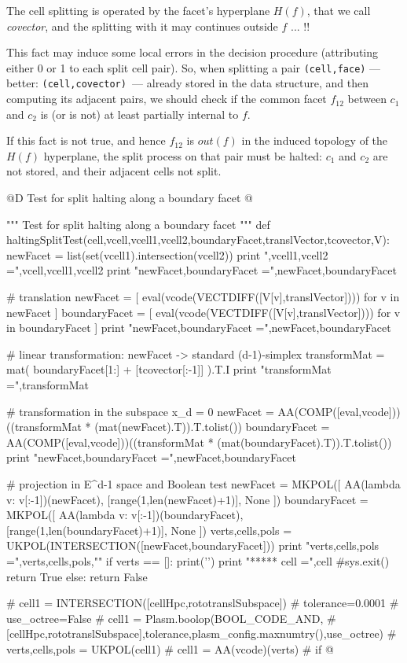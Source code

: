 \documentclass[11pt,oneside]{article}	%
\begin{document}
The cell splitting is operated by the facet's hyperplane $H(f)$, that we call \emph{covector},  and the splitting with it may continues outside $f$ ... !!

This fact may induce some local errors in the decision procedure (attributing either 0 or 1 to each split cell pair).
So, when splitting a pair \texttt{(cell,face)} --- better: \texttt{(cell,covector) }--- already stored in the data structure, and then computing its adjacent  pairs,
we should check if the common facet $f_{12}$ between $c_1$ and $c_2$ is (or is not) at least partially internal  to $f$.  

If this fact is not true, and hence $f_{12}$ is $out(f)$  in the induced topology of the $H(f)$ hyperplane, the split process on that pair must be halted:  $c_1$ and $c_2$ are not stored, and their adjacent cells not split.


@D Test for split halting along a boundary facet
@{""" Test for split halting along a boundary facet """
def haltingSplitTest(cell,vcell,vcell1,vcell2,boundaryFacet,translVector,tcovector,V):
	newFacet = list(set(vcell1).intersection(vcell2))
	print "\nvcell,vcell1,vcell2 =",vcell,vcell1,vcell2
	print "newFacet,boundaryFacet =",newFacet,boundaryFacet
	
	# translation 
	newFacet = [ eval(vcode(VECTDIFF([V[v],translVector]))) for v in newFacet ]
	boundaryFacet = [ eval(vcode(VECTDIFF([V[v],translVector]))) for v in boundaryFacet ]
	print "newFacet,boundaryFacet =",newFacet,boundaryFacet
	
	# linear transformation: newFacet -> standard (d-1)-simplex
	transformMat = mat( boundaryFacet[1:] + [tcovector[:-1]] ).T.I
	print "transformMat =",transformMat
	
	# transformation in the subspace x_d = 0
	newFacet = AA(COMP([eval,vcode]))((transformMat * (mat(newFacet).T)).T.tolist())
	boundaryFacet = AA(COMP([eval,vcode]))((transformMat * (mat(boundaryFacet).T)).T.tolist())
	print "newFacet,boundaryFacet =",newFacet,boundaryFacet
	
	# projection in E^{d-1} space and Boolean test
	newFacet = MKPOL([ AA(lambda v: v[:-1])(newFacet), [range(1,len(newFacet)+1)], None ])
	boundaryFacet = MKPOL([ AA(lambda v: v[:-1])(boundaryFacet), [range(1,len(boundaryFacet)+1)], None ])
	verts,cells,pols = UKPOL(INTERSECTION([newFacet,boundaryFacet]))
	print "verts,cells,pols =",verts,cells,pols,"\n"
	if verts == []: 
		print('\a')
		print "\n****** cell =",cell
		#sys.exit()
		return True
	else: return False


# cell1 = INTERSECTION([cellHpc,rototranslSubspace])
# tolerance=0.0001
# use_octree=False
# cell1 = Plasm.boolop(BOOL_CODE_AND, 
# 	[cellHpc,rototranslSubspace],tolerance,plasm_config.maxnumtry(),use_octree)
# verts,cells,pols = UKPOL(cell1)
# cell1 = AA(vcode)(verts)
# if 
@}
\end{document}
